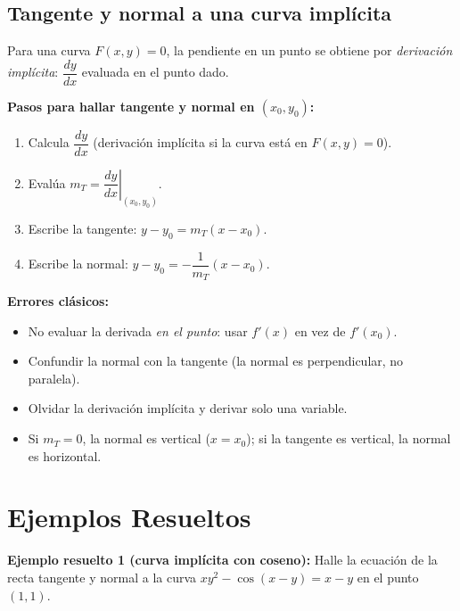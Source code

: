 \documentclass[12pt, letterpaper]{article}
\begin{document}
\subsection{Tangente y normal a una curva implícita}

Para una curva $F(x,y)=0$, la pendiente en un punto se obtiene por \emph{derivación implícita}: $\dfrac{dy}{dx}$ evaluada en el punto dado.

\begin{cuadropasos}
  \textbf{Pasos para hallar tangente y normal en $(x_0, y_0)$:}
  \begin{enumerate}
    \item Calcula $\dfrac{dy}{dx}$ (derivación implícita si la curva está en $F(x,y)=0$).
    \item Evalúa $m_T = \left.\dfrac{dy}{dx}\right|_{(x_0,y_0)}$.
    \item Escribe la tangente: $y - y_0 = m_T(x - x_0)$.
    \item Escribe la normal: $y - y_0 = -\dfrac{1}{m_T}(x - x_0)$.
  \end{enumerate}
\end{cuadropasos}

\begin{cuadroadvertencia}
  \textbf{Errores clásicos:}
  \begin{itemize}
    \item No evaluar la derivada \emph{en el punto}: usar $f'(x)$ en vez de $f'(x_0)$.
    \item Confundir la normal con la tangente (la normal es perpendicular, no paralela).
    \item Olvidar la derivación implícita y derivar solo una variable.
    \item Si $m_T = 0$, la normal es vertical ($x = x_0$); si la tangente es vertical, la normal es horizontal.
  \end{itemize}
\end{cuadroadvertencia}

\newpage
\section{Ejemplos Resueltos}

\noindent\textbf{Ejemplo resuelto 1 (curva implícita con coseno):} Halle la ecuación de la recta tangente y normal a la curva $xy^2 - \cos(x-y) = x - y$ en el punto $(1,1)$.
\end{document}
